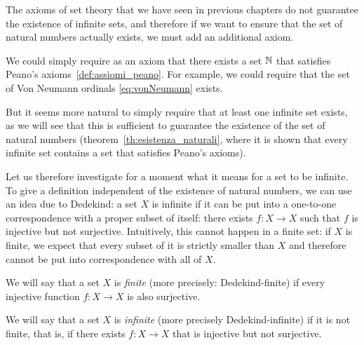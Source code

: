 The axioms of set theory that we have seen in previous chapters
do not guarantee the existence of infinite sets, and therefore if 
we want to ensure that the set of natural numbers actually exists, 
we must add an additional axiom. 

We could simply require as an axiom that there exists a set ${\mathbb N}$ that satisfies
Peano's axioms~\ref{def:assiomi_peano}.
For example, we could require 
that the set of Von Neumann ordinals \eqref{eq:vonNeumann} exists. 

But it seems more natural to simply require that at least one infinite set
exists,
as we will see that this is sufficient to guarantee the existence of the set of
natural numbers
(theorem~\ref{th:esistenza_naturali}, where it is shown that every infinite set
contains a set
that satisfies Peano's axioms).

Let us therefore investigate for a moment what it means for a set to be
infinite.
To give a definition independent of the existence of natural numbers, we can use
an idea due to Dedekind:
a set $X$ is infinite if it can be put into a one-to-one correspondence 
with a proper subset of itself: 
there exists $f\colon X\to X$ such that $f$ is injective but not surjective. 
Intuitively, this cannot happen in a finite set: 
if $X$ is finite, we expect that every subset of it is strictly smaller than $X$
and therefore cannot be put into correspondence with all of $X$.

\begin{definition}
  \label{def:infinito}%
  We will say that a set $X$ is \emph{finite}
  (more precisely: Dedekind-finite)
  if every injective function $f\colon X\to X$ is also surjective.
%

  We will say that a set $X$ is \emph{infinite} 
  (more precisely Dedekind-infinite)
  if it is not finite, that is,
  if there exists $f\colon X\to X$ that is injective but not surjective.
%
\end{definition}


